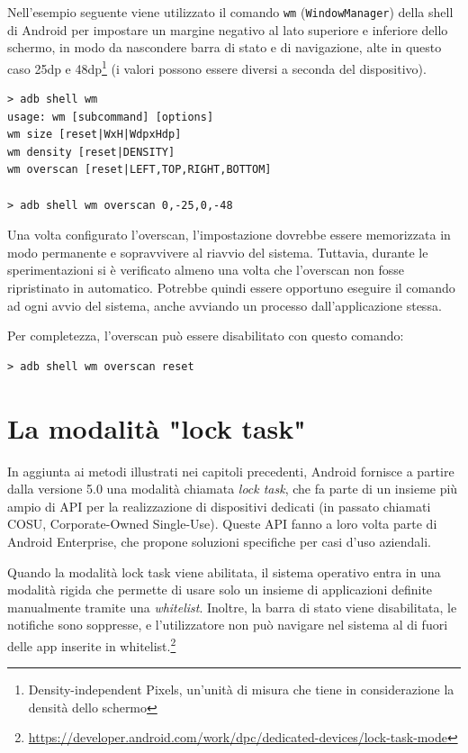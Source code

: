 Nell'esempio seguente viene utilizzato il comando \texttt{wm} (\texttt{WindowManager}) della shell di Android per impostare un margine negativo al lato superiore e inferiore dello schermo, in modo da nascondere barra di stato e di navigazione, alte in questo caso 25dp e 48dp\footnote{Density-independent Pixels, un'unità di misura che tiene in considerazione la densità dello schermo} (i valori possono essere diversi a seconda del dispositivo).

\begin{verbatim}
> adb shell wm
usage: wm [subcommand] [options]
wm size [reset|WxH|WdpxHdp]
wm density [reset|DENSITY]
wm overscan [reset|LEFT,TOP,RIGHT,BOTTOM]

> adb shell wm overscan 0,-25,0,-48
\end{verbatim}

Una volta configurato l'overscan, l'impostazione dovrebbe essere memorizzata in modo permanente e sopravvivere al riavvio del sistema. Tuttavia, durante le sperimentazioni si è verificato almeno una volta che l'overscan non fosse ripristinato in automatico. Potrebbe quindi essere opportuno eseguire il comando ad ogni avvio del sistema, anche avviando un processo dall'applicazione stessa.

Per completezza, l'overscan può essere disabilitato con questo comando:

\begin{verbatim}
> adb shell wm overscan reset
\end{verbatim}


\section{La modalità "lock task"}
\label{sec:kiosk_locktask}

In aggiunta ai metodi illustrati nei capitoli precedenti, Android fornisce a partire dalla versione 5.0 una modalità chiamata \emph{lock task}, che fa parte di un insieme più ampio di API per la realizzazione di dispositivi dedicati (in passato chiamati COSU, Corporate-Owned Single-Use). Queste API fanno a loro volta parte di Android Enterprise, che propone soluzioni specifiche per casi d'uso aziendali.

Quando la modalità lock task viene abilitata, il sistema operativo entra in una modalità rigida che permette di usare solo un insieme di applicazioni definite manualmente tramite una \emph{whitelist}. Inoltre, la barra di stato viene disabilitata, le notifiche sono soppresse, e l'utilizzatore non può navigare nel sistema al di fuori delle app inserite in whitelist.\footnote{\url{https://developer.android.com/work/dpc/dedicated-devices/lock-task-mode}}

